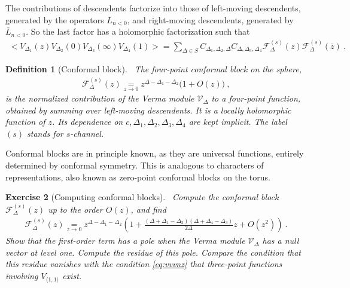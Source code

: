 \documentclass[12pt, a4paper]{article}
\theoremstyle{break}
\newtheorem{exo}{Exercise}[section]
\newtheorem{defn}[exo]{Definition}
\begin{document}
The contributions of descendents factorize into those of left-moving descendents, generated by the operators $L_{n<0}$, and right-moving descendents, generated by $\bar L_{n<0}$. So the last factor has a holomorphic factorization such that 
\begin{align}
\Big<V_{\Delta_1}(z)V_{\Delta_2}(0)V_{\Delta_3}(\infty)V_{\Delta_4}(1)\Big>
 =\sum_{\Delta\in S} C_{\Delta_1,\Delta_2,\Delta} C_{\Delta,\Delta_3,\Delta_4}  \mathcal{F}^{(s)}_\Delta(z) \mathcal{F}^{(s)}_\Delta(\bar z)\ .
 \label{sdec}
\end{align}

\begin{defn}[Conformal block]
 ~\label{def:block}
 The four-point conformal block on the sphere,
 \begin{align}
  \mathcal{F}^{(s)}_\Delta(z) \underset{z\to 0}{=} z^{\Delta-\Delta_1-\Delta_2}\Big( 1 + O(z) \Big)\ ,
  \label{eq:gsd}
 \end{align}
is the normalized contribution of the Verma module $\mathcal V_\Delta$ to a four-point function, obtained by summing over left-moving descendents. It is a locally holomorphic function of $z$. Its dependence on $c,\Delta_1,\Delta_2,\Delta_3,\Delta_4$ are kept implicit. The label $(s)$ stands for $s$-channel.
\end{defn}
Conformal blocks are in principle known, as they are universal functions, entirely determined by conformal symmetry. 
This is analogous to characters of representations, also known as zero-point conformal blocks on the torus.

\begin{exo}[Computing conformal blocks]
 ~\label{exo:block}
 Compute the conformal block $ \mathcal{F}^{(s)}_\Delta(z)$ up to the order $O(z)$, and find
 \begin{align}
  \mathcal{F}^{(s)}_\Delta(z) \underset{z\to 0}{=} z^{\Delta-\Delta_1-\Delta_2}\left( 1 + \frac{(\Delta+\Delta_1-\Delta_2)(\Delta+\Delta_4-\Delta_3)}{2\Delta}z + O(z^2) \right)\ .
  \label{eq:fsl}
 \end{align}
 Show that the first-order term has a pole when the Verma module $\mathcal{V}_\Delta$ has a null vector at level one.
 Compute the residue of this pole. Compare the condition that this residue vanishes with the condition \eqref{eq:vvvnz} that three-point functions involving $V_{\langle 1,1\rangle}$ exist.
\end{exo}
\end{document}
